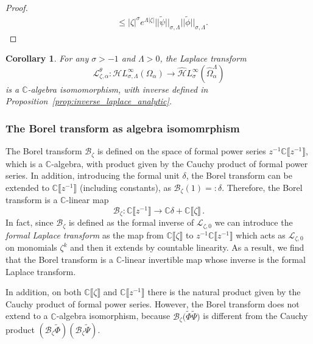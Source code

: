 \documentclass{article}
\newcommand{\singexp}[2]{\mathcal{H}L^\infty_{#1, #2}}
\newcommand{\dualsingexp}[1]{\widehat{\mathcal{H}}L^\infty_{#1}}
\newcommand{\C}{\mathbb{C}}
\newcommand{\series}[1]{\tilde{#1}}
\newcommand{\laplace}{\mathcal{L}}
\newcommand{\borel}{\mathcal{B}}
\theoremstyle{definition}
\theoremstyle{plain}
\newtheorem{corollary}[theorem]{Corollary}
\newenvironment{verify}{\color{ForestGreen}}{\color{black}}
\newenvironment{old}{\color{RoyalBlue}}{\color{black}}
\begin{document}
\begin{old}
\begin{verify}
\begin{proof}
\begin{align*}
        &\le |\zeta|^{\sigma}e^{\Lambda|\zeta|} ||\series{\psi}||_{\sigma,\Lambda} ||\series{\phi}||_{\sigma,\Lambda}. 
    \end{align*}
\end{proof}
\end{verify}
\begin{corollary}
For any $\sigma > -1$ and $\Lambda > 0$, the Laplace transform 
\[ \laplace_{\zeta,\alpha}^\theta\colon\singexp{\sigma}{\Lambda}(\Omega_\alpha) \to \dualsingexp{\sigma}(\widehat{\Omega}_\alpha^\Lambda) \]
is a $\C$-algebra isomomorphism, with inverse defined in Proposition~\ref{prop:inverse_laplace_analytic}. 
\end{corollary}\end{old}
%
\subsubsection*{The Borel transform as algebra isomomrphism}
%
The Borel transform $\borel_\zeta$ is defined on the space of formal power series $z^{-1}\C\llbracket z^{-1}\rrbracket$, which is a $\C$-algebra, with product given by the Cauchy product of formal power series. In addition, introducing the formal unit $\delta$, the Borel transform can be extended to $\C\llbracket z^{-1}\rrbracket$ (including constants), as $\borel_\zeta(1)=:\delta$. Therefore, the Borel transform is a $\C$-linear map
 \[\borel_\zeta\colon\C\llbracket z^{-1}\rrbracket\to\C\delta + \C\llbracket\zeta\rrbracket\,.\] 
In fact, since $\borel_\zeta$ is defined as the formal inverse of $\laplace_{\zeta,0}$ we can introduce the \textit{formal Laplace transform} as the map from $\C\llbracket \zeta\rrbracket$ to $z^{-1}\C\llbracket z^{-1}\rrbracket$ which acts as $\laplace_{\zeta,0}$ on monomials $\zeta^k$ and then it extends by countable linearity. As a result, we find that the Borel transform is a $\C$-linear invertible map whose inverse is the formal Laplace transform.

In addition, on both $\C\llbracket\zeta\rrbracket$ and $\C\llbracket z^{-1}\rrbracket$ there is the natural product given by the Cauchy product of formal power series. However, the Borel transform does not extend to a $\C$-algebra isomorphism, because $\borel_\zeta\big(\series{\Phi}\series{\Psi}\big)$ is different from the Cauchy product $(\borel_\zeta \series{\Phi})(\borel_\zeta \series{\Psi})$.
\end{document}
